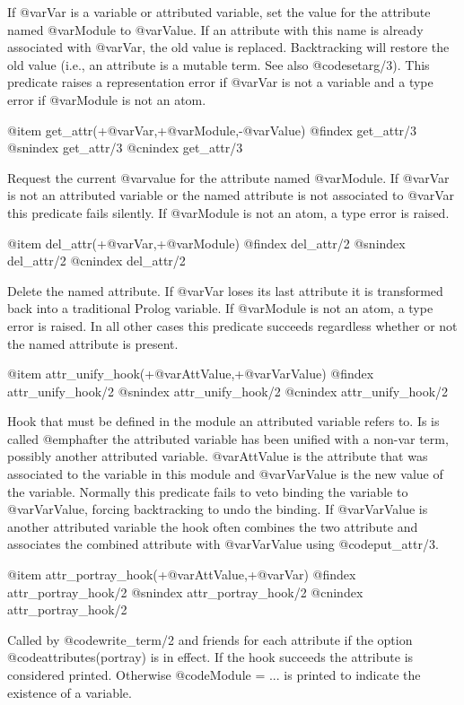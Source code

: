 {{{{{{{{{If @var{Var} is a variable or attributed variable, set the value for the
attribute named @var{Module} to @var{Value}. If an attribute with this
name is already associated with @var{Var}, the old value is replaced.
Backtracking will restore the old value (i.e., an attribute is a mutable
term. See also @code{setarg/3}). This predicate raises a representation error if
@var{Var} is not a variable and a type error if @var{Module} is not an atom.

@item get_attr(+@var{Var},+@var{Module},-@var{Value})
@findex get_attr/3
@snindex get_attr/3
@cnindex get_attr/3

Request the current @var{value} for the attribute named @var{Module}.  If
@var{Var} is not an attributed variable or the named attribute is not
associated to @var{Var} this predicate fails silently.  If @var{Module}
is not an atom, a type error is raised.

@item del_attr(+@var{Var},+@var{Module})
@findex del_attr/2
@snindex del_attr/2
@cnindex del_attr/2

Delete the named attribute.  If @var{Var} loses its last attribute it
is transformed back into a traditional Prolog variable.  If @var{Module}
is not an atom, a type error is raised. In all other cases this
predicate succeeds regardless whether or not the named attribute is
present.

@item attr_unify_hook(+@var{AttValue},+@var{VarValue})
@findex attr_unify_hook/2
@snindex attr_unify_hook/2
@cnindex attr_unify_hook/2

Hook that must be defined in the module an attributed variable refers
to. Is is called @emph{after} the attributed variable has been
unified with a non-var term, possibly another attributed variable.
@var{AttValue} is the attribute that was associated to the variable
in this module and @var{VarValue} is the new value of the variable.
Normally this predicate fails to veto binding the variable to
@var{VarValue}, forcing backtracking to undo the binding.  If
@var{VarValue} is another attributed variable the hook often combines
the two attribute and associates the combined attribute with
@var{VarValue} using @code{put_attr/3}.

@item attr_portray_hook(+@var{AttValue},+@var{Var})
@findex attr_portray_hook/2
@snindex attr_portray_hook/2
@cnindex attr_portray_hook/2

Called by @code{write_term/2} and friends for each attribute if the option
@code{attributes(portray)} is in effect.  If the hook succeeds the
attribute is considered printed.  Otherwise  @code{Module = ...} is
printed to indicate the existence of a variable.

}}}}}}}}}
